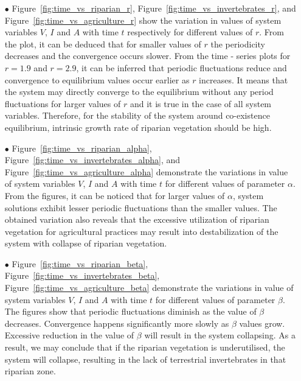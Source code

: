 \documentclass[12pt]{article}
\numberwithin{equation}{section}
\begin{document}
\begin{itemize}
\item[$\bullet$] Figure~\ref{fig:time_vs_riparian_r}, Figure~\ref{fig:time_vs_invertebrates_r}, and Figure~\ref{fig:time_vs_agriculture_r} show the variation in values of system variables $V$, $I$ and $A$ with time $t$ respectively for different values of $r$. From the plot, it can be deduced that for smaller values of $r$ the periodicity decreases and the convergence occurs slower. From the time - series plots for $r = 1.9$ and $r=2.9$, it can be inferred that periodic fluctuations reduce and convergence to equilibrium values occur earlier as $r$ increases. It means that the system may directly converge to the equilibrium without any period fluctuations for larger values of $r$ and it is true in the case of all system variables. Therefore, for the stability of the system around co-existence equilibrium, intrinsic growth rate of riparian vegetation should be high.
\item[$\bullet$] Figure~\ref{fig:time_vs_riparian_alpha}, Figure~\ref{fig:time_vs_invertebrates_alpha}, and Figure~\ref{fig:time_vs_agriculture_alpha} demonstrate the variations in value of system variables $V$, $I$ and $A$ with time $t$ for different values of parameter $\alpha$.
From the figures, it can be noticed that for larger values of $\alpha$, system solutions exhibit lesser periodic fluctuations than the smaller values. The obtained variation also reveals that the excessive utilization of riparian vegetation for agricultural practices may result into destabilization of the system with collapse of riparian vegetation.    

\item[$\bullet$] Figure~\ref{fig:time_vs_riparian_beta}, Figure~\ref{fig:time_vs_invertebrates_beta}, Figure~\ref{fig:time_vs_agriculture_beta} demonstrate the variations in value of system variables $V$, $I$ and $A$ with time $t$ for different values of parameter $\beta$. The figures show that periodic fluctuations diminish as the value of $\beta$ decreases. Convergence happens significantly more slowly as $\beta$ values grow. Excessive reduction in the value of $\beta$ will result in the system collapsing. As a result, we may conclude that if the riparian vegetation is underutilised, the system will collapse, resulting in the lack of terrestrial invertebrates in that riparian zone.


\end{itemize}
\end{document}
